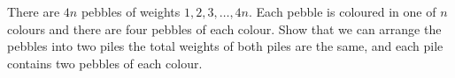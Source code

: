 There are $4n$ pebbles of weights $1, 2, 3, \dots, 4n$.
Each pebble is coloured in one of $n$ colours
and there are four pebbles of each colour.
Show that we can arrange the pebbles into two piles
the total weights of both piles are the same,
and each pile contains two pebbles of each colour.